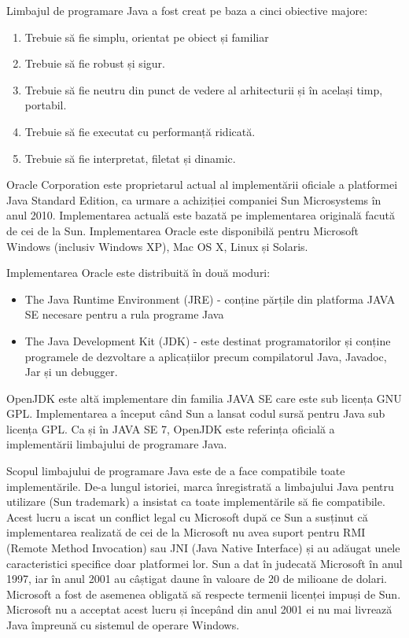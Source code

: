 \documentclass[12pt]{book}
\begin{document}
Limbajul de programare Java a fost creat pe baza a cinci obiective majore:
\begin{addmargin}[4em]{1em}
\begin{enumerate}
	\item Trebuie să fie simplu, orientat pe obiect și familiar		
	\item Trebuie să fie robust și sigur.
	\item Trebuie să fie neutru din punct de vedere al arhitecturii și în același timp, portabil.
	\item Trebuie să fie executat cu performanță ridicată.
	\item Trebuie să fie interpretat, filetat și dinamic. 
	\cite{thinkJava}
\end{enumerate}
\end{addmargin}
\bigbreak
Oracle Corporation este proprietarul actual al implementării oficiale a platformei Java Standard Edition, ca urmare a achiziției companiei Sun Microsystems în anul 2010. Implementarea actuală este bazată pe implementarea originală facută de cei de la Sun. Implementarea Oracle este disponibilă pentru Microsoft Windows (inclusiv Windows XP), Mac OS X, Linux și Solaris. 
	
Implementarea Oracle este distribuită în două moduri:
\begin{addmargin}[4em]{1em}
\begin{itemize}
\item The Java Runtime Environment (JRE) - conține părțile din platforma JAVA SE necesare pentru a rula programe Java 
\item The Java Development Kit (JDK) - este destinat programatorilor și conține programele de dezvoltare a aplicațiilor precum compilatorul Java, Javadoc, Jar și un debugger. 
\cite{thinkJava}	
\end{itemize}
\end{addmargin}
\bigbreak
OpenJDK este altă implementare din familia JAVA SE care este sub licența GNU GPL. Implementarea a început când Sun a lansat codul sursă pentru Java sub licența GPL. Ca și în JAVA SE 7, OpenJDK este referința oficială a implementării limbajului de programare Java. \cite{thinkJava}

Scopul limbajului de programare Java este de a face compatibile toate implementările. De-a lungul istoriei, marca înregistrată a limbajului Java pentru utilizare (Sun trademark) a insistat ca toate implementările să fie compatibile. Acest lucru a iscat un conflict legal cu Microsoft după ce Sun a susținut că implementarea realizată de cei de la Microsoft nu avea suport pentru RMI (Remote Method Invocation) sau JNI (Java Native Interface) și au adăugat unele caracteristici specifice doar platformei lor. Sun a dat în judecată Microsoft în anul 1997, iar în anul 2001 au câștigat daune în valoare de 20 de milioane de dolari. Microsoft a fost de asemenea obligată să respecte termenii licenței impuși de Sun. Microsoft nu a acceptat acest lucru și începând din anul 2001 ei nu mai livrează Java împreună cu sistemul de operare Windows.
\end{document}
